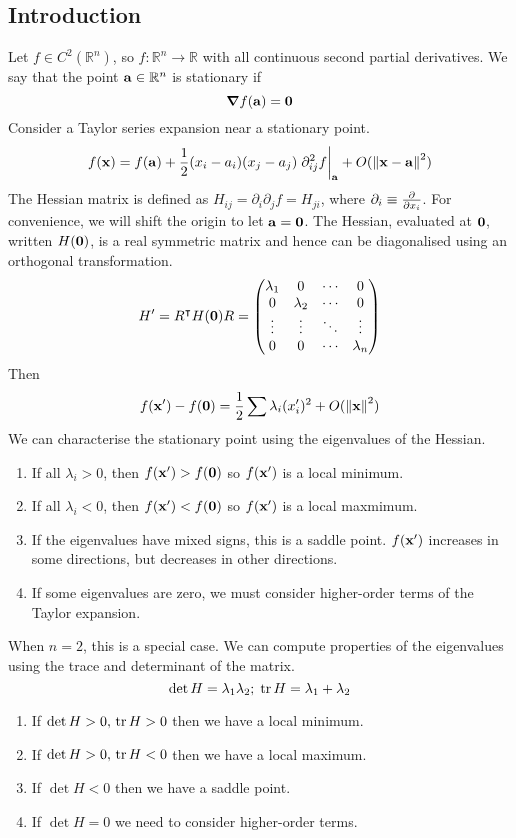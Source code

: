 \subsection{Introduction}
Let \(f \in C^2(\mathbb R^n)\), so \(f \colon \mathbb R^n \to \mathbb R\) with all continuous second partial derivatives.
We say that the point \( \vb a \in \mathbb R^n \) is stationary if
\[
	\grad{f(\vb a)} = \vb 0
\]
Consider a Taylor series expansion near a stationary point.
\[
	f(\vb x) = f(\vb a) + \frac{1}{2} (x_i - a_i)(x_j - a_j) \eval{\partial^2_{ij} f}_{\vb a} + O(\norm{\vb x - \vb a}^2)
\]
The Hessian matrix is defined as \(H_{ij} = \partial_i \partial_j f = H_{ji}\), where \(\partial_i \equiv \pdv{}{x_i}\).
For convenience, we will shift the origin to let \(\vb a = \vb 0\).
The Hessian, evaluated at \(\vb 0\), written \(H(\vb 0)\), is a real symmetric matrix and hence can be diagonalised using an orthogonal transformation.
\[
	H' = R^\intercal H(\vb 0) R = \begin{pmatrix}
		\lambda_1 & 0         & \cdots & 0         \\
		0         & \lambda_2 & \cdots & 0         \\
		\vdots    & \vdots    & \ddots & \vdots    \\
		0         & 0         & \cdots & \lambda_n
	\end{pmatrix}
\]
Then
\[
	f(\vb x') - f(\vb 0) = \frac{1}{2} \sum \lambda_i (x_i')^2 + O(\norm{\vb x}^2)
\]
We can characterise the stationary point using the eigenvalues of the Hessian.
\begin{enumerate}
	\item If all \(\lambda_i > 0\), then \(f(\vb x') > f(\vb 0)\) so \(f(\vb x')\) is a local minimum.
	\item If all \(\lambda_i < 0\), then \(f(\vb x') < f(\vb 0)\) so \(f(\vb x')\) is a local maxmimum.
	\item If the eigenvalues have mixed signs, this is a saddle point.
	      \(f(\vb x')\) increases in some directions, but decreases in other directions.
	\item If some eigenvalues are zero, we must consider higher-order terms of the Taylor expansion.
\end{enumerate}
When \(n = 2\), this is a special case.
We can compute properties of the eigenvalues using the trace and determinant of the matrix.
\[
	\det H = \lambda_1 \lambda_2;\;\tr H = \lambda_1 + \lambda_2
\]
\begin{enumerate}
	\item If \(\det H > 0,\,\tr H > 0\) then we have a local minimum.
	\item If \(\det H > 0,\,\tr H < 0\) then we have a local maximum.
	\item If \(\det H < 0\) then we have a saddle point.
	\item If \(\det H = 0\) we need to consider higher-order terms.
\end{enumerate}

